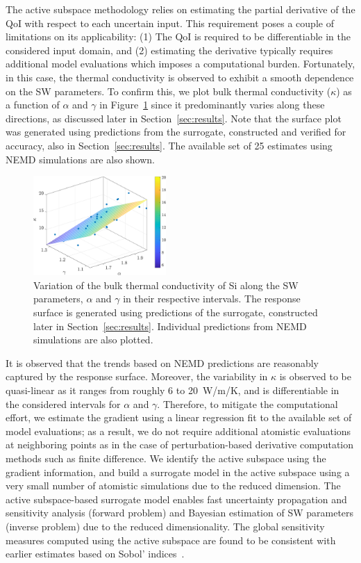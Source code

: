 The active subspace methodology relies on estimating the partial derivative of the QoI 
with respect to each uncertain input. This requirement poses a couple of limitations on its
applicability: (1) The QoI is required to be differentiable in the considered input domain, and (2)
estimating the derivative typically requires additional model evaluations which
imposes a computational burden. Fortunately, in this case,
the thermal conductivity is observed to exhibit a smooth dependence on the SW parameters. 
To confirm this, we plot bulk thermal conductivity ($\kappa$) as a function of $\alpha$
and $\gamma$ in Figure~\ref{fig:kag} since it
predominantly varies along these directions, as discussed later
in Section~\ref{sec:results}. Note that the surface plot was generated using predictions from
the surrogate, constructed and verified for accuracy, also in Section~\ref{sec:results}.
The available set of 25 estimates using NEMD simulations are also shown. 
%
\begin{figure}[htbp]
\begin{center}
\includegraphics[width=0.45\textwidth]{./Figures/k_3D}
\caption{Variation of the bulk thermal conductivity of Si along the SW parameters, $\alpha$ 
and $\gamma$ in their respective intervals. The response surface is generated using predictions
of the surrogate, constructed later in Section~\ref{sec:results}. Individual predictions from NEMD
simulations are also plotted.}
\label{fig:kag}
\end{center}
\end{figure}
%
It is observed that the trends based on NEMD predictions are reasonably captured by
the response surface. Moreover, the variability in $\kappa$ is
observed to be quasi-linear as it ranges from roughly 6 to 20~W/m/K, and is  
differentiable in the considered intervals for $\alpha$ and $\gamma$.
Therefore, to mitigate the computational effort, we estimate the gradient
using a linear regression fit to the available set of model evaluations; as a result, we do not 
require additional atomistic evaluations at neighboring points as in the case of perturbation-based
derivative computation methods such as finite difference. We identify the active subspace
using the gradient information, and build a surrogate
model in the active subspace using a very small number of atomistic simulations
due to the reduced dimension. The active subspace-based surrogate model enables fast
uncertainty propagation and sensitivity analysis (forward problem) and Bayesian estimation
of SW parameters (inverse problem) due to the reduced dimensionality. 
The global sensitivity measures computed using the
active subspace are found to be consistent with earlier estimates 
based on Sobol' indices~\cite{Vohra:2018a}.

